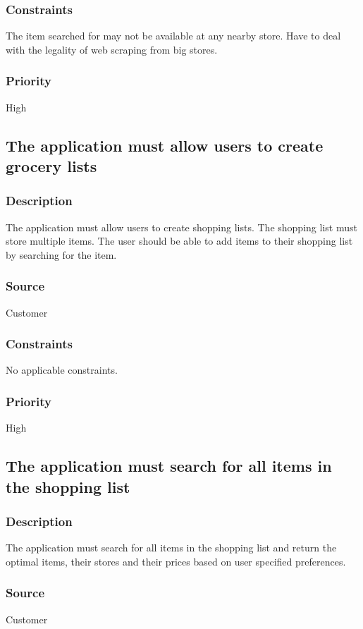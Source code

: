 \subsubsection{Constraints}
The item searched for may not be available at any nearby store. Have to deal with the legality of web scraping from big stores.
\subsubsection{Priority}
High\\

\subsection{The application must allow users to create grocery lists}
\subsubsection{Description}
The application must allow users to create shopping lists. The shopping list must store multiple items. The user should be able to add items to their shopping list by searching for the item.
\subsubsection{Source}
Customer
\subsubsection{Constraints}
No applicable constraints.
\subsubsection{Priority}
High\\

\subsection{The application must search for all items in the shopping list}
\subsubsection{Description}
The application must search for all items in the shopping list and return the optimal items, their stores and their prices based on user specified preferences.
\subsubsection{Source}
Customer
